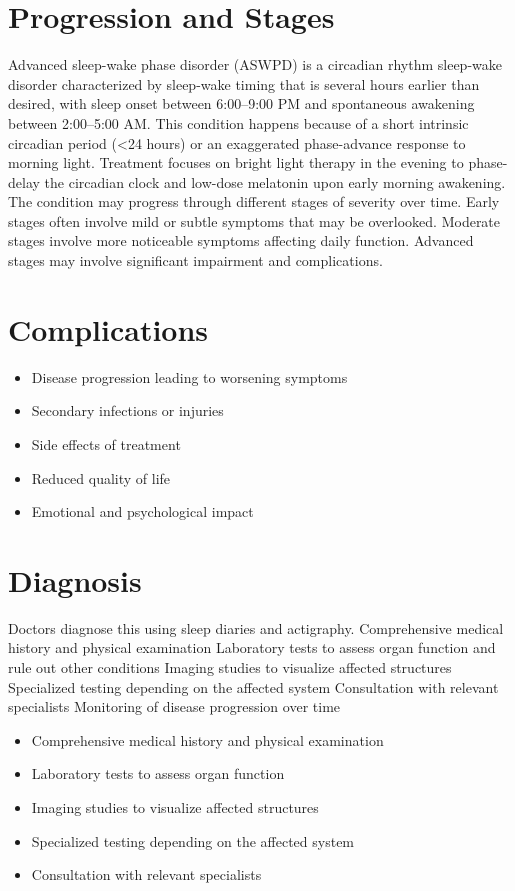 \section{Progression and Stages}
Advanced sleep-wake phase disorder (ASWPD) is a circadian rhythm sleep-wake disorder characterized by sleep-wake timing that is several hours earlier than desired, with sleep onset between 6:00--9:00 PM and spontaneous awakening between 2:00--5:00 AM. This condition happens because of a short intrinsic circadian period (<24 hours) or an exaggerated phase-advance response to morning light. Treatment focuses on bright light therapy in the evening to phase-delay the circadian clock and low-dose melatonin upon early morning awakening. The condition may progress through different stages of severity over time. Early stages often involve mild or subtle symptoms that may be overlooked. Moderate stages involve more noticeable symptoms affecting daily function. Advanced stages may involve significant impairment and complications.
\section{Complications}
\begin{itemize}[noitemsep]
  \item Disease progression leading to worsening symptoms
  \item Secondary infections or injuries
  \item Side effects of treatment
  \item Reduced quality of life
  \item Emotional and psychological impact
\end{itemize}
\section{Diagnosis}
Doctors diagnose this using sleep diaries and actigraphy. Comprehensive medical history and physical examination Laboratory tests to assess organ function and rule out other conditions Imaging studies to visualize affected structures Specialized testing depending on the affected system Consultation with relevant specialists Monitoring of disease progression over time

\begin{itemize}[noitemsep]
  \item Comprehensive medical history and physical examination
  \item Laboratory tests to assess organ function
  \item Imaging studies to visualize affected structures
  \item Specialized testing depending on the affected system
  \item Consultation with relevant specialists
\end{itemize}
